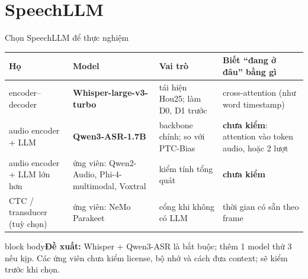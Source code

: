 \documentclass[aspectratio=169,xcolor=table]{beamer}
\newcommand{\bad}[1]{\textcolor{RiskRed}{\textbf{#1}}}
\newcommand{\nbox}[2][block body]{\begin{beamercolorbox}[sep=0.45em,rounded=true]{#1}\footnotesize #2\end{beamercolorbox}}
\begin{document}
\section{SpeechLLM}
\begin{frame}{Chọn SpeechLLM để thực nghiệm}
\par\vspace{0.2cm}
\centering\scriptsize\setlength{\tabcolsep}{4pt}
\begin{tabular}{L{2.9cm}L{3.4cm}L{3.5cm}L{3.9cm}}
\toprule
Họ & Model & Vai trò & Biết ``đang ở đâu'' bằng gì\\
\midrule
encoder--decoder & \textbf{Whisper-large-v3-turbo} & tái hiện Hou25; làm D0, D1 trước & cross-attention (như word timestamp)\\
audio encoder + LLM & \textbf{Qwen3-ASR-1.7B} & backbone chính; so với PTC-Bias & \bad{chưa kiểm}: attention vào token audio, hoặc 2 lượt\\
audio encoder + LLM lớn hơn & ứng viên: Qwen2-Audio, Phi-4-multimodal, Voxtral & kiểm tính tổng quát & \bad{chưa kiểm}\\
CTC / transducer (tuỳ chọn) & ứng viên: NeMo Parakeet & cổng khi không có LLM & thời gian có sẵn theo frame\\
\bottomrule
\end{tabular}\par
\vspace{0.3cm}\raggedright
\nbox{\textbf{Đề xuất:} Whisper + Qwen3-ASR là bắt buộc; thêm 1 model thứ 3 nếu kịp. Các ứng viên chưa kiểm license, bộ nhớ và cách đưa context; sẽ kiểm trước khi chọn.}
\end{frame}
\end{document}
